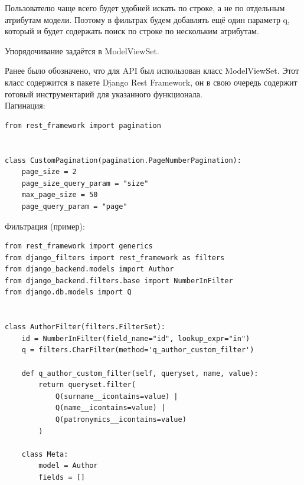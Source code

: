 \documentclass[a4paper,14pt]{extarticle}
\begin{document}
Пользователю чаще всего будет удобней искать по строке, а не по отдельным атрибутам модели. Поэтому
в фильтрах будем добавлять ещё один параметр q, который и будет содержать поиск по строке по нескольким
атрибутам.

Упорядочивание задаётся в ModelViewSet.

Ранее было обозначено, что для API был использован класс ModelViewSet. Этот класс содержится в
пакете Django Rest Framework, он в свою очередь содержит готовый инструментарий для указанного функционала.\\
Пагинация:\\
\begin{verbatim}
from rest_framework import pagination


class CustomPagination(pagination.PageNumberPagination):
    page_size = 2
    page_size_query_param = "size"
    max_page_size = 50
    page_query_param = "page"
\end{verbatim}
Фильтрация (пример):\\
\begin{verbatim}
from rest_framework import generics
from django_filters import rest_framework as filters
from django_backend.models import Author
from django_backend.filters.base import NumberInFilter
from django.db.models import Q


class AuthorFilter(filters.FilterSet):
    id = NumberInFilter(field_name="id", lookup_expr="in")
    q = filters.CharFilter(method='q_author_custom_filter')

    def q_author_custom_filter(self, queryset, name, value):
        return queryset.filter(
            Q(surname__icontains=value) |
            Q(name__icontains=value) |
            Q(patronymics__icontains=value)
        )

    class Meta:
        model = Author
        fields = []
\end{verbatim}
\end{document}
